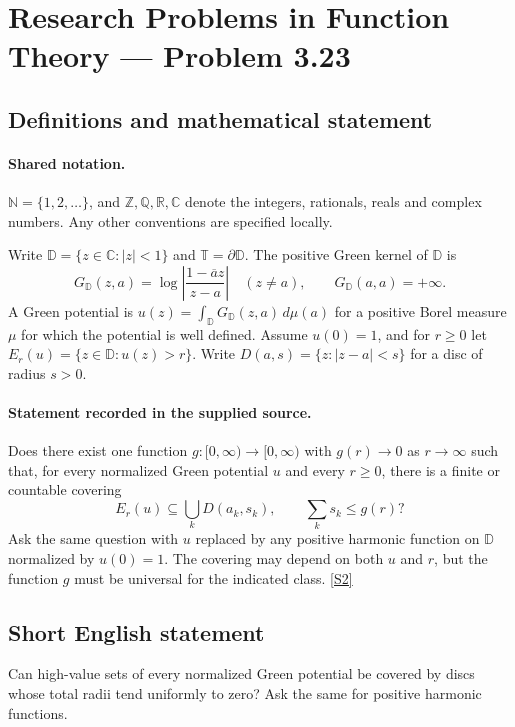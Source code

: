 \documentclass[11pt]{book}
\newcommand{\sref}[2]{\hyperlink{source:#1:#2}{[S#2]}}
\begin{document}
\section{Research Problems in Function Theory — Problem 3.23}\label{statement}

\subsection{Definitions and mathematical statement}

\paragraph{Shared notation.}$\mathbb N=\{1,2,\ldots\}$, and $\mathbb Z,\mathbb Q,\mathbb R,\mathbb C$ denote the integers, rationals, reals and complex numbers. Any other conventions are specified locally.


Write $\mathbb D=\{z\in\mathbb C:|z|<1\}$ and $\mathbb T=\partial\mathbb D$. The positive Green kernel of $\mathbb D$ is
\[G_{\mathbb D}(z,a)=\log\left|\frac{1-\overline a z}{z-a}\right|\quad(z\ne a),\qquad G_{\mathbb D}(a,a)=+\infty.
\]
A Green potential is $u(z)=\int_{\mathbb D}G_{\mathbb D}(z,a)\,d\mu(a)$ for a positive Borel measure $\mu$ for which the potential is well defined. Assume $u(0)=1$, and for $r\ge0$ let $E_r(u)=\{z\in\mathbb D:u(z)>r\}$. Write $D(a,s)=\{z:|z-a|<s\}$ for a disc of radius $s>0$.
\paragraph{Statement recorded in the supplied source.}
Does there exist one function $g:[0,\infty)\to[0,\infty)$ with $g(r)\to0$ as $r\to\infty$ such that, for every normalized Green potential $u$ and every $r\ge0$, there is a finite or countable covering
\[E_r(u)\subseteq\bigcup_kD(a_k,s_k),\qquad\sum_ks_k\le g(r)?\]
Ask the same question with $u$ replaced by any positive harmonic function on $\mathbb D$ normalized by $u(0)=1$. The covering may depend on both $u$ and $r$, but the function $g$ must be universal for the indicated class. \sref{statement}{2}
\subsection{Short English statement}
Can high-value sets of every normalized Green potential be covered by discs whose total radii tend uniformly to zero? Ask the same for positive harmonic functions.
\end{document}
